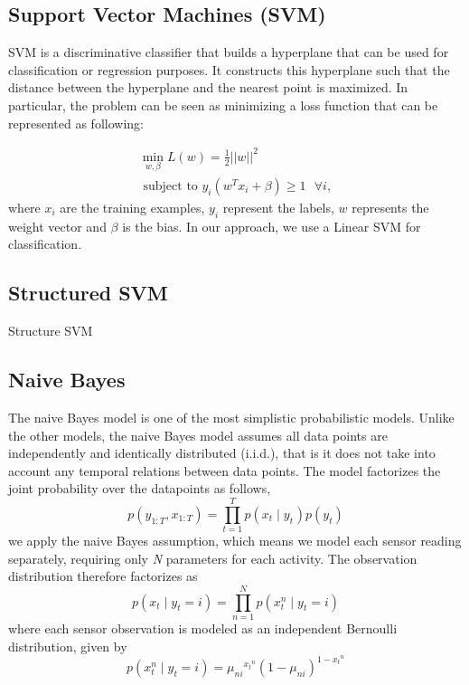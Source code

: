 \documentclass[11pt, oneside]{article}   	%
\begin{document}
\subsection{Support Vector Machines (SVM)}  
SVM is a discriminative classifier that builds a hyperplane that can be used for classification or regression purposes. It constructs this hyperplane such that 
the distance between the hyperplane and the nearest point is maximized.  In particular, the problem can be seen as minimizing a loss function that can be represented as following:

\begin{align*}
\min_{w, \beta} L(w) = \frac{1}{2}||w||^{2} \\ 
\text{ subject to } y_{i}(w^{T} x_{i} + \beta) \geq 1 \text{ } \forall i,
\end{align*}
where $x_i$ are the training examples, $y_i$ represent the labels, $w$ represents the weight vector and $\beta$ is the bias. In our approach, we use
a Linear SVM for classification.
 
\subsection{Structured SVM}
Structure SVM
\subsection{Naive Bayes}
The naive Bayes model is one of the most simplistic probabilistic models. Unlike the other models, the naive Bayes model assumes all data points are independently and identically distributed (i.i.d.), that is it does not take into account any temporal relations between data points. The model factorizes the joint probability over the datapoints as follows,
\begin{equation}
p({y}_{1:T},{x}_{1:T})=\prod_{t=1}^{T}p({{x}_{t}\mid {y}_{t}}^{})p({y}_{t})
\end{equation}
we apply the naive Bayes assumption, which means we model each sensor reading separately, requiring only
\textit{N} parameters for each activity. The observation distribution therefore factorizes as
\begin{equation}
p({x}_{t}\mid{y}_{t}=i)=\prod_{n=1}^{N}p({{x}_{t}^{n}\mid {y}_{t}}=i)
\end{equation}
where each sensor observation is modeled as an independent Bernoulli distribution, given by
\begin{equation}
p({{x}_{t}^{n}\mid {y}_{t}}=i)={{\mu}_{ni}}^{{{x}_{t}}^n}{(1-{\mu}_{ni})}^{1-{{x}_{t}}^n}
\end{equation}
\end{document}
